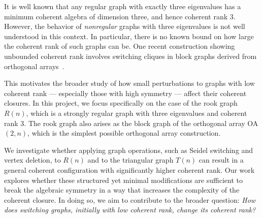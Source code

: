 It is well known that any regular graph with exactly three eigenvalues has a minimum coherent algebra of dimension three, and hence coherent rank 3. However, the behavior of \emph{nonregular} graphs with three eigenvalues is not well understood in this context. In particular, there is no known bound on how large the coherent rank of such graphs can be. One recent construction showing unbounded coherent rank involves switching cliques in block graphs derived from orthogonal arrays~\cite{greaves2024coherentrankgrapheigenvalues}.

This motivates the broader study of how small perturbations to graphs with low coherent rank — especially those with high symmetry — affect their coherent closures. In this project, we focus specifically on the case of the rook graph $R(n)$, which is a strongly regular graph with three eigenvalues and coherent rank 3. The rook graph also arises as the block graph of the orthogonal array OA$(2,n)$, which is the simplest possible orthogonal array construction. 

We investigate whether applying graph operations, such as Seidel switching and vertex deletion, to $R(n)$ and to the triangular graph $T(n)$ can result in a general coherent configuration with significantly higher coherent rank. Our work explores whether these structured yet minimal modifications are sufficient to break the algebraic symmetry in a way that increases the complexity of the coherent closure. In doing so, we aim to contribute to the broader question: \emph{How does switching graphs, initially with low coherent rank, change its coherent rank?}
